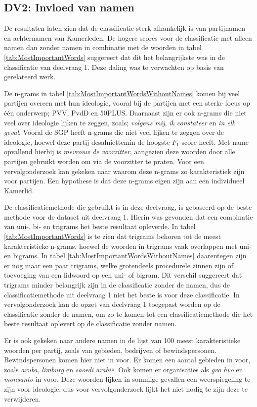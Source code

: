 \subsection{DV2: Invloed van namen}
De resultaten laten zien dat de classificatie sterk afhankelijk is van partijnamen en achternamen van Kamerleden. De hogere scores voor de classificatie met alleen namen dan zonder namen in combinatie met de woorden in tabel \ref{tab:MostImportantWords} suggereert dat dit het belangrijkste was in de classificatie van deelvraag 1. Deze daling was te verwachten op basis van gerelateerd werk.\par
De n-grams in tabel \ref{tab:MostImportantWordsWithoutNames} komen bij veel partijen overeen met hun ideologie, vooral bij de partijen met een sterke focus op één onderwerp; PVV, PvdD en 50PLUS. Daarnaast zijn er ook n-grams die niet veel over ideologie lijken te zeggen, zoals; \textit{volgens mij}, \textit{ik constateer} en \textit{in elk geval}. Vooral de SGP heeft n-grams die niet veel lijken te zeggen over de ideologie, hoewel deze partij desalniettemin de hoogste $F_1$ score heeft. Met name opvallend hierbij is \textit{mevrouw de voorzitter}, aangezien deze woorden door alle partijen gebruikt worden om via de voorzitter te praten. Voor een vervolgonderzoek kan gekeken naar waarom deze n-grams zo karakteristiek zijn voor partijen. Een hypothese is dat deze n-grams eigen zijn aan een individueel Kamerlid.\par
De classificatiemethode die gebruikt is in deze deelvraag, is gebaseerd op de beste methode voor de dataset uit deelvraag 1. Hierin was gevonden dat een combinatie van uni-, bi- en trigrams het beste resultaat opleverde. In tabel \ref{tab:MostImportantWords} is te zien dat trigrams behoren tot de meest karakteristieke n-grams, hoewel de woorden in trigrams vaak overlappen met uni- en bigrams. In tabel \ref{tab:MostImportantWordsWithoutNames} daarentegen zijn er nog maar een paar trigrams, welke grotendeels procedurele zinnen zijn of toevoeging van een lidwoord op een uni- of bigram. Dit verschil suggereert dat trigrams minder belangrijk zijn in de classificatie zonder de namen, dus de classificatiemethode uit deelvraag 1 niet het beste is voor deze classificatie. In vervolgonderzoek kan de opzet van deelvraag 1 toegepast worden op de classificatie zonder de namen, om zo te komen tot een classificatiemethode die het beste resultaat oplevert op de classificatie zonder namen.\par
Er is ook gekeken naar andere namen in de lijst van 100 meest karakteristieke woorden per partij, zoals van gebieden, bedrijven of bewindspersonen. Bewindspersonen komen hier niet in voor. Er komen een aantal gebieden in voor, zoals \textit{aruba}, \textit{limburg} en \textit{saoedi arabië}. Ook komen er organisaties als \textit{gvo} \textit{hvo} en \textit{monsanto} in voor. Deze woorden lijken in sommige gevallen een weerspiegeling te zijn voor ideologie, dus voor vervolgonderzoek lijkt het niet nodig te zijn deze te verwijderen.\par

